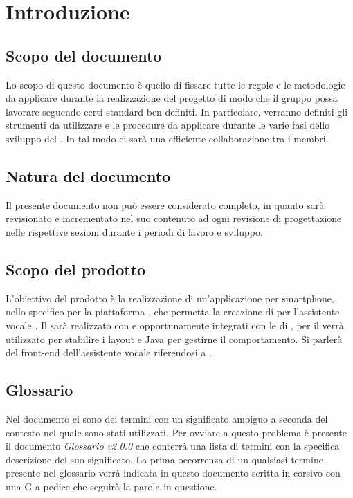 \section{Introduzione}
\label{sec:intro}
\subsection{Scopo del documento}
Lo scopo di questo documento è quello di fissare tutte le regole e le metodologie da applicare durante la realizzazione del progetto di modo che il gruppo possa lavorare seguendo certi standard ben definiti. In particolare, verranno definiti gli strumenti da utilizzare e le procedure da applicare durante le varie fasi dello sviluppo del . In tal modo ci sarà una efficiente collaborazione tra i membri.
\subsection{Natura del documento}
Il presente documento non può essere considerato completo, in quanto sarà revisionato e incrementato nel suo contenuto ad ogni revisione di progettazione nelle rispettive sezioni durante i periodi di lavoro e sviluppo.
\subsection{Scopo del prodotto}
L'obiettivo del prodotto è la realizzazione di un'applicazione per smartphone, nello specifico per la piattaforma , che permetta la creazione di  per l'assistente vocale  . Il  sarà realizzato con  e  opportunamente integrati con le  di , per il  verrà utilizzato  per stabilire i layout e Java per gestirne il comportamento. Si parlerà del front-end dell'assistente vocale riferendosi a .
\subsection{Glossario}
Nel documento ci sono dei termini con un significato ambiguo a seconda del contesto nel quale sono stati utilizzati. Per ovviare a questo problema è presente il documento \emph{Glossario v2.0.0} che conterrà una lista di termini con la specifica descrizione del suo significato. La prima occorrenza di un qualsiasi termine presente nel glossario verrà indicata in questo documento scritta in corsivo con una G a pedice che seguirà la parola in questione.
